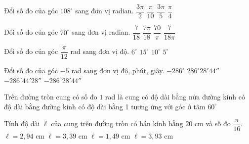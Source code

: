 \begin{ex}%
	Đổi số đo của góc $108^{\circ}$ sang đơn vị radian.
	\choice
	{$\dfrac{3\pi}{2}$}
	{$\dfrac{\pi}{10}$}
	{\True $\dfrac{3\pi}{5}$}
	{$\dfrac{\pi}{4}$}
	\loigiai{
	}
\end{ex}


\begin{ex}%
	Đổi số đo của góc $70^{\circ}$ sang đơn vị radian.
	\choice
	{$\dfrac{7}{18}$}
	{\True $\dfrac{7\pi}{18}$}
	{$\dfrac{70}{\pi}$}
	{$\dfrac{7}{18\pi}$}
\end{ex}

\begin{ex}%
	Đổi số đo của góc $\dfrac{\pi}{12}$ rad sang đơn vị độ.
	\choice
	{$6^{\circ}$}
	{\True $15^{\circ}$}
	{$10^{\circ}$}
	{$5^{\circ}$}
\end{ex}

\begin{ex}%
	Đổi số đo của góc $-5$ rad sang đơn vị độ, phút, giây.
	\choice
	{$-286^{\circ}$}
	{$286^{\circ}28'44''$}
	{$-286^{\circ}44'28''$}
	{\True $-286^{\circ}28'44''$}
\end{ex}

\begin{ex}%
	Trên đường tròn cung có số đo $1$ rad là cung
	\choice
	{\True có độ dài bằng nửa đường kính}
	{có độ dài bằng đường kính}
	{có độ dài bằng 1}
	{tương ứng với góc ở tâm $60^{\circ}$}
\end{ex}

\begin{ex}%
	Tính độ dài $\ell $ của cung trên đường tròn có bán kính bằng $20$ cm và số đo $\dfrac{\pi}{16}.$
	\choice
	{$\ell =2{,}94$ cm}
	{$\ell =3{,}39$ cm}
	{$\ell =1{,}49$ cm}
	{\True $\ell =3{,}93$ cm}
\end{ex}

